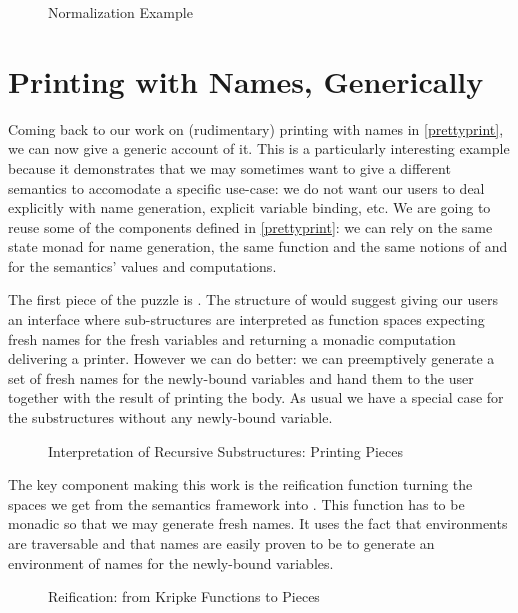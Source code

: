 \begin{figure}[h]
\caption{Normalization Example\label{fig:normid3}}
\end{figure}


\section{Printing with Names, Generically}

Coming back to our work on (rudimentary) printing with names in \cref{prettyprint},
we can now give a generic account of it. This is a particularly interesting example
because it demonstrates that we may sometimes want to give  a different
semantics to accomodate a specific use-case: we do not want our users to deal explicitly
with name generation, explicit variable binding, etc. We are going to reuse some of the
components defined in \cref{prettyprint}: we can rely on the same state monad for
name generation, the same  function and the same notions of 
and  for the semantics' values and computations.

The first piece of the puzzle is . The structure of  would
suggest giving our users an interface where sub-structures are interpreted as 
function spaces expecting fresh names for the fresh variables and returning a monadic
computation delivering a printer. However we can do better: we can preemptively generate
a set of fresh names for the newly-bound variables and hand them to the user together
with the result of printing the body. As usual we have a special case for the substructures
without any newly-bound variable.

\begin{figure}[h]
\caption{Interpretation of Recursive Substructures: Printing Pieces\label{fig:printingpieces}}
\end{figure}

The key component making this work is the reification function 
turning the  spaces we get from the semantics framework into . This
function has to be monadic so that we may generate fresh names. It uses the fact that
environments are traversable and that names are easily proven to be  to
generate an environment of names for the newly-bound variables.

\begin{figure}[h]
\caption{Reification: from Kripke Functions to Pieces\label{fig:printingreify}}
\end{figure}

